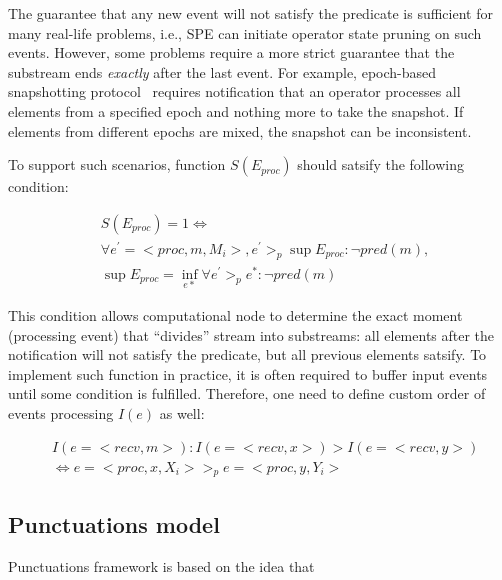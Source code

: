 The guarantee that any new event will not satisfy the predicate is sufficient for many real-life problems, i.e., SPE can initiate operator state pruning on such events. However, some problems require a more strict guarantee that the substream ends {\em exactly} after the last event. For example, epoch-based snapshotting protocol~\cite{2015arXiv150608603C, jacques2016consistent} requires notification that an operator processes all elements from a specified epoch and nothing more to take the snapshot. If elements from different epochs are mixed, the snapshot can be inconsistent.

To support such scenarios, function $S(E_{proc})$ should satsify the following condition:

\begin{align*}
& S(E_{proc}) = 1  \Longleftrightarrow \\
& \forall e^{'} = <proc,m,M_i>, e^{'} >_p \sup E_{proc} : \neg pred(m), \\
& \sup E_{proc} = \inf_{e*} \forall e^{'} >_p e^{*} : \neg pred(m) 
\end{align*}

This condition allows computational node to determine the exact moment (processing event) that ``divides'' stream into substreams: all elements after the notification will not satisfy the predicate, but all previous elements satsify. To implement such function in practice, it is often required to buffer input events until some condition is fulfilled. Therefore, one need to define custom order of events processing $I(e)$ as well:

\begin{align*}
& I(e=<recv,m>): I(e=<recv, x>) > I(e=<recv, y>) \\
& \Longleftrightarrow e=<proc,x,X_i> >_p e=<proc,y,Y_i>
\end{align*}

\subsection{Punctuations model}

Punctuations framework is based on the idea that 
